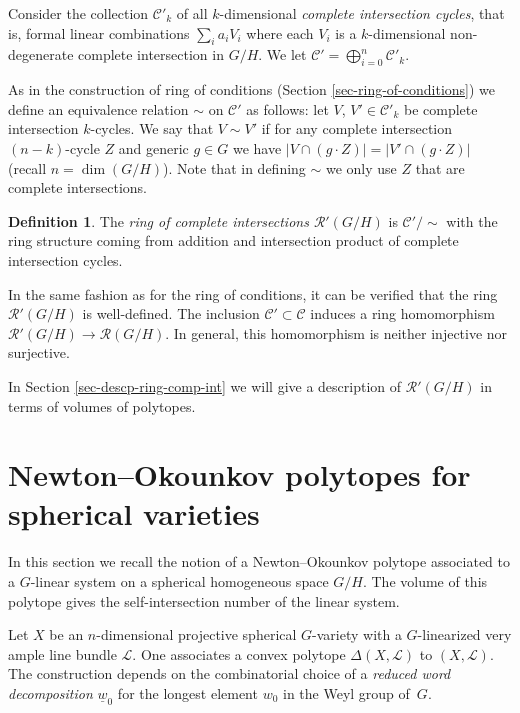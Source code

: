 \documentclass[10pt,a4paper]{amsart}
\def \w{{\underline{w}_0}}
\numberwithin{equation}{section}
\theoremstyle{definition}
\newtheorem{Def}[Th]{Definition}
\begin{document}
Consider the collection $\mathcal{C}'_k$ of all $k$-dimensional {\it complete intersection cycles}, that is, formal linear combinations $\sum_i a_i V_i$ where each $V_i$ is a $k$-dimensional non-degenerate complete intersection in $G/H$. We let $\mathcal{C}' = \bigoplus_{i=0}^n \mathcal{C}'_k$.

As in the construction of ring of conditions (Section \ref{sec-ring-of-conditions}) we define an equivalence relation $\sim$ on $\mathcal{C}'$ as follows: let $V$, $V' \in \mathcal{C}'_k$ be complete intersection $k$-cycles. We say that $V \sim V'$ if for any complete intersection $(n-k)$-cycle $Z$ and generic $g \in G$ we have
$|V \cap (g \cdot Z)| = |V' \cap (g \cdot Z)|$ (recall $n = \dim(G/H)$).
Note that in defining $\sim$ we only use $Z$ that are complete intersections.

\begin{Def} \label{def-ring-of-complete-intersections}
The {\it ring of complete intersections $\mathcal{R}'(G/H)$} is
$\mathcal{C}' /{\sim}$ with the ring structure coming from addition and intersection product of complete intersection cycles.
\end{Def}

In the same fashion as for the ring of conditions, it can be verified that the ring $\mathcal{R}'(G/H)$ is well-defined.
The inclusion $\mathcal{C}' \subset \mathcal{C}$ induces a ring homomorphism $\mathcal{R}'(G/H) \to \mathcal{R}(G/H)$. In general, this homomorphism is neither injective nor surjective.

In Section \ref{sec-descp-ring-comp-int} we will give a description of $\mathcal{R}'(G/H)$ in terms of volumes of polytopes.

\section{Newton--Okounkov polytopes for spherical varieties} \label{sec-NO-polytope-sph-var}
In this section we recall the notion of a Newton--Okounkov polytope associated to a $G$-linear system on a spherical homogeneous space $G/H$. The volume of this polytope gives the self-intersection number of the linear system.

Let $X$ be an $n$-dimensional projective spherical $G$-variety with a $G$-linearized very ample line bundle ${\mathcal L}$. One associates a convex polytope $\Delta(X, {\mathcal L})$ to $(X, {\mathcal L})$. The construction depends on the combinatorial choice of a {\it reduced word decomposition} $\w$ for the longest element $w_0$ in the Weyl group of~$G$.
\end{document}
